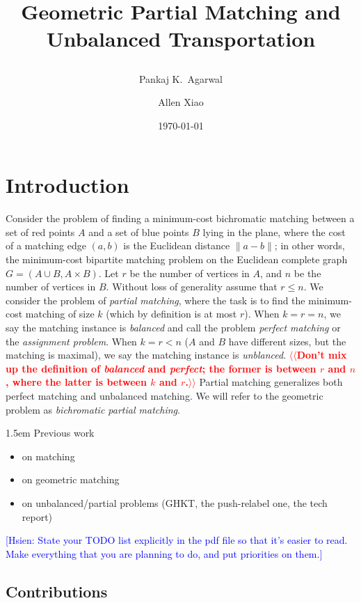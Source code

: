 \documentclass[11pt]{article}
\title{ Geometric Partial Matching and Unbalanced Transportation %
\date{\today} %
\author{
Pankaj K.\ Agarwal
\and
Allen Xiao
}
}
\makeatletter
\theoremstyle{plain}
\def\n@te#1{\textsf{\boldmath \textbf{$\langle\!\langle$#1$\rangle\!\rangle$}}\leavevmode}
\def\note#1{\textcolor{red}{\n@te{#1}}}
\newenvironment{TODO}
   {\fboxrule1.5pt\begin{center}
     \marginpar{\LARGE\color{Red}$\bigstar\bigstar\bigstar$}
     \begin{lrbox}{\tempboxa}
     \begin{minipage}{0.9\columnwidth}
     \small\sffamily\parindent1.5em\color{TODOtxtcolor}}
   {\end{minipage}
    \end{lrbox}
    \fcolorbox{TODOtxtcolor}{TODOcolor}{\usebox{\tempboxa}}\end{center}}
\makeatother
\begin{document}
\maketitle

\section{Introduction}

Consider the problem of finding a minimum-cost bichromatic matching between
a set of red points $A$ and a set of blue points $B$ lying in the plane,
where the cost of a matching edge $(a, b)$ is the Euclidean distance
$\|a - b\|$;
in other words, the minimum-cost bipartite matching problem on the Euclidean
complete graph $G = (A \cup B, A \times B)$.
Let $r$ be the number of vertices in $A$, and $n$ be the number of vertices in $B$.
Without loss of generality assume that $r \leq n$.
We consider the problem of \emph{partial matching}, where the task is to
find the minimum-cost matching of size $k$ (which by definition is at most $r$).
When $k = r = n$, we say the matching instance is \emph{balanced}
and call the problem \emph{perfect matching} or the \emph{assignment problem}.
When $k = r < n$ ($A$ and $B$ have different sizes, but the matching is
maximal), we say the matching instance is \emph{unblanced}.
\note{Don't mix up the definition of \emph{balanced} and \emph{perfect}; the former is between $r$ and $n$, where the latter is between $k$ and $r$.}
Partial matching generalizes both perfect matching and unbalanced matching.
We will refer to the geometric problem as \emph{bichromatic partial matching}.

\begin{TODO}
Previous work
\smallskip
\begin{itemize}\itemsep=0pt
	\item on matching
	\item on geometric matching
	\item on unbalanced/partial problems (GHKT, the push-relabel one, the tech report)
\end{itemize}
\textcolor{blue}{[Hsien: State your TODO list explicitly in the pdf file so that it's easier to read.  Make everything that you are planning to do, and put priorities on them.]}
\end{TODO}


\subsection{Contributions}
\end{document}
